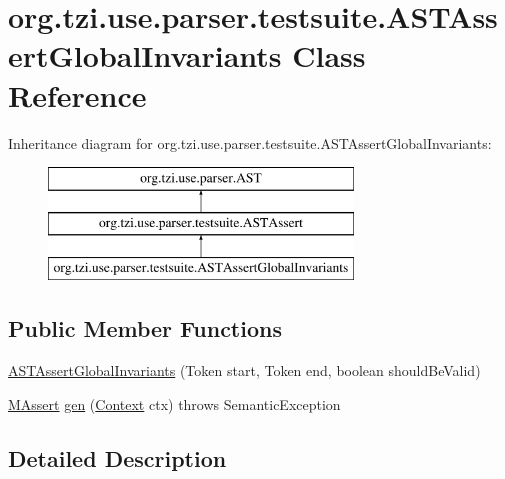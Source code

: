 \hypertarget{classorg_1_1tzi_1_1use_1_1parser_1_1testsuite_1_1_a_s_t_assert_global_invariants}{\section{org.\-tzi.\-use.\-parser.\-testsuite.\-A\-S\-T\-Assert\-Global\-Invariants Class Reference}
\label{classorg_1_1tzi_1_1use_1_1parser_1_1testsuite_1_1_a_s_t_assert_global_invariants}
}
Inheritance diagram for org.\-tzi.\-use.\-parser.\-testsuite.\-A\-S\-T\-Assert\-Global\-Invariants\-:\begin{figure}[H]
\begin{center}
\leavevmode
\includegraphics[height=3.000000cm]{classorg_1_1tzi_1_1use_1_1parser_1_1testsuite_1_1_a_s_t_assert_global_invariants}
\end{center}
\end{figure}
\subsection*{Public Member Functions}
\begin{DoxyCompactItemize}
\item 
\hyperlink{classorg_1_1tzi_1_1use_1_1parser_1_1testsuite_1_1_a_s_t_assert_global_invariants_ae435dd1d138407fd806cf0d2071946b0}{A\-S\-T\-Assert\-Global\-Invariants} (Token start, Token end, boolean should\-Be\-Valid)
\item 
\hyperlink{classorg_1_1tzi_1_1use_1_1uml_1_1sys_1_1testsuite_1_1_m_assert}{M\-Assert} \hyperlink{classorg_1_1tzi_1_1use_1_1parser_1_1testsuite_1_1_a_s_t_assert_global_invariants_a472b0ce663600179c54a21d72c48a538}{gen} (\hyperlink{classorg_1_1tzi_1_1use_1_1parser_1_1_context}{Context} ctx)  throws Semantic\-Exception 
\end{DoxyCompactItemize}


\subsection{Detailed Description}


